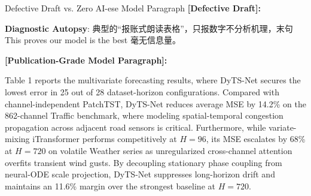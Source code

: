 \begin{ExampleBox}{Defective Draft vs. Zero AI-ese Model Paragraph}
\textbf{\color{TargetHighlight}[Defective Draft]:}\par
{}\par\vspace{4pt}
\textbf{Diagnostic Autopsy}: 典型的“报账式朗读表格”，只报数字不分析机理，末句 This proves our model is the best 毫无信息量。\par\vspace{6pt}
\textbf{\color{AcadNavy}[Publication-Grade Model Paragraph]:}\par
Table 1 reports the multivariate forecasting results, where DyTS-Net secures the lowest error in 25 out of 28 dataset-horizon configurations. Compared with channel-independent PatchTST, DyTS-Net reduces average MSE by 14.2\% on the 862-channel Traffic benchmark, where modeling spatial-temporal congestion propagation across adjacent road sensors is critical. Furthermore, while variate-mixing iTransformer performs competitively at $H=96$, its MSE escalates by 68\% at $H=720$ on volatile Weather series as unregularized cross-channel attention overfits transient wind gusts. By decoupling stationary phase coupling from neural-ODE scale projection, DyTS-Net suppresses long-horizon drift and maintains an 11.6\% margin over the strongest baseline at $H=720$.
\end{ExampleBox}
